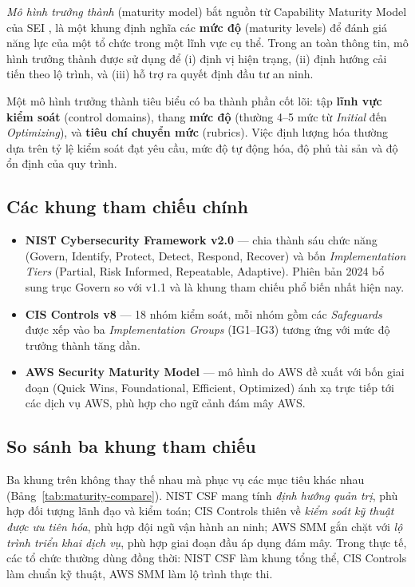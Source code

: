 \textit{Mô hình trưởng thành} (maturity model) bắt nguồn từ Capability Maturity Model của SEI \cite{sei_cmm_1993}, là một khung định nghĩa các \textbf{mức độ} (maturity levels) để đánh giá năng lực của một tổ chức trong một lĩnh vực cụ thể. Trong an toàn thông tin, mô hình trưởng thành được sử dụng để (i) định vị hiện trạng, (ii) định hướng cải tiến theo lộ trình, và (iii) hỗ trợ ra quyết định đầu tư an ninh.

Một mô hình trưởng thành tiêu biểu có ba thành phần cốt lõi: tập \textbf{lĩnh vực kiểm soát} (control domains), thang \textbf{mức độ} (thường 4--5 mức từ \textit{Initial} đến \textit{Optimizing}), và \textbf{tiêu chí chuyển mức} (rubrics). Việc định lượng hóa thường dựa trên tỷ lệ kiểm soát đạt yêu cầu, mức độ tự động hóa, độ phủ tài sản và độ ổn định của quy trình.

\subsection{Các khung tham chiếu chính}
\label{subsec:maturity-frameworks}

\begin{itemize}
  \item \textbf{NIST Cybersecurity Framework v2.0} \cite{nist_csf_2024} --- chia thành sáu chức năng (Govern, Identify, Protect, Detect, Respond, Recover) và bốn \textit{Implementation Tiers} (Partial, Risk Informed, Repeatable, Adaptive). Phiên bản 2024 bổ sung trục Govern so với v1.1 và là khung tham chiếu phổ biến nhất hiện nay.
  \item \textbf{CIS Controls v8} \cite{cis_controls_v8} --- 18 nhóm kiểm soát, mỗi nhóm gồm các \textit{Safeguards} được xếp vào ba \textit{Implementation Groups} (IG1--IG3) tương ứng với mức độ trưởng thành tăng dần.
  \item \textbf{AWS Security Maturity Model} \cite{aws_smm} --- mô hình do AWS đề xuất với bốn giai đoạn (Quick Wins, Foundational, Efficient, Optimized) ánh xạ trực tiếp tới các dịch vụ AWS, phù hợp cho ngữ cảnh đám mây AWS.
\end{itemize}

\subsection{So sánh ba khung tham chiếu}
\label{subsec:maturity-compare}

Ba khung trên không thay thế nhau mà phục vụ các mục tiêu khác nhau (Bảng~\ref{tab:maturity-compare}). NIST CSF mang tính \textit{định hướng quản trị}, phù hợp đối tượng lãnh đạo và kiểm toán; CIS Controls thiên về \textit{kiểm soát kỹ thuật được ưu tiên hóa}, phù hợp đội ngũ vận hành an ninh; AWS SMM gắn chặt với \textit{lộ trình triển khai dịch vụ}, phù hợp giai đoạn đầu áp dụng đám mây. Trong thực tế, các tổ chức thường dùng đồng thời: NIST CSF làm khung tổng thể, CIS Controls làm chuẩn kỹ thuật, AWS SMM làm lộ trình thực thi.

